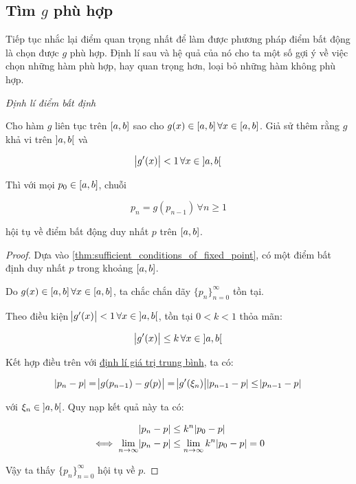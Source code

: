 \documentclass[../../Lectures.tex]{subfiles}
\begin{document}
\subsection{Tìm \(g\) phù hợp}

Tiếp tục nhắc lại điểm quan trọng nhất để làm được phương pháp điểm bất động là
chọn được \(g\) phù hợp. Định lí sau và hệ quả của nó cho ta một số gợi ý về
việc chọn những hàm phù hợp, hay quan trọng hơn, loại bỏ những hàm không phù
hợp.

\begin{theorem}\label{thm:fixed_point}
    \emph{Định lí điểm bất định}

    Cho hàm \(g\) liên tục trên \(\interval{a}{b}\) sao cho \(g(x) \in
    \interval{a}{b} \, \forall x \in \interval{a}{b}\). Giả sử thêm rằng \(g\)
    khả vi trên \(\interval[open]{a}{b}\) và

    \[\abs{g'(x)} < 1 \, \forall x \in \interval[open]{a}{b}\]

    Thì với mọi \(p_0 \in \interval{a}{b}\), chuỗi

    \[p_n = g(p_{n - 1}) \, \forall n \geq 1\]

    hội tụ về điểm bất động duy nhất \(p\) trên \(\interval{a}{b}\).
\end{theorem}

\begin{proof}\label{proof:thm:fixed_point}
    Dựa vào \ref{thm:sufficient_conditions_of_fixed_point}, có một điểm bất định
    duy nhất \(p\) trong khoảng \(\interval{a}{b}\).

    Do \(g(x) \in \interval{a}{b} \, \forall x \in \interval{a}{b}\), ta chắc
    chắn dãy \(\{p_n\}_{n = 0}^\infty\) tồn tại.

    Theo điều kiện \(\abs{g'(x)} < 1 \, \forall x \in \interval[open]{a}{b}\),
    tồn tại \(0 < k < 1\) thỏa mãn:

    \[\abs{g'(x)} \leq k \, \forall x \in \interval[open]{a}{b}\]

    Kết hợp điều trên với \hyperref[thm:mean_value_theorem]{định lí giá trị
    trung bình}, ta có:

    \[\abs{p_n - p} = \abs{g(p_{n - 1}) - g(p)} = \abs{g'(\xi_n)} \abs{p_{n - 1} - p} \leq \abs{p_{n - 1} - p}\]

    với \(\xi_n \in \interval[open]{a}{b}\). Quy nạp kết quả này ta có:

    \[\begin{aligned}
                                 \abs{p_n - p} & \leq k^n \abs{p_0 - p} \\
        \iff \lim_{n \to \infty} \abs{p_n - p} & \leq \lim_{n \to \infty} k^n \abs{p_0 - p} = 0
    \end{aligned}\]

    Vậy ta thấy \(\{p_n\}_{n = 0}^\infty\) hội tụ về \(p\).
\end{proof}
\end{document}
